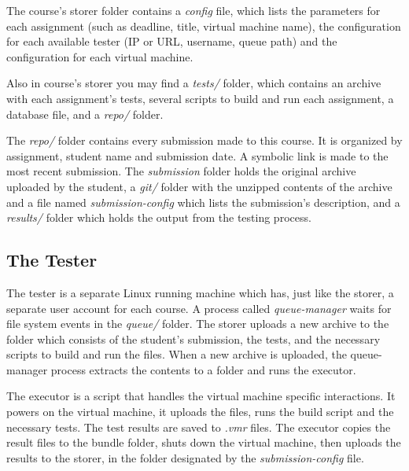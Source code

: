 The course's storer folder contains a {\it config} file, which lists the parameters
for each assignment (such as deadline, title, virtual machine name), the 
configuration for each available tester (IP or URL, username, queue path)
and the configuration for each virtual machine.

Also in course's storer you may find a \textit{tests/} folder, which contains an archive
with each assignment's tests, several scripts to build and run each assignment,
a database file, and a \textit{repo/} folder.

\begin{center}
\end{center}

The \textit{repo/} folder contains every submission made to this course. It is organized
by assignment, student name and submission date. A symbolic link is made to the 
most recent submission. The {\it submission} folder holds the original archive uploaded
by the student, a \textit{git/} folder with the unzipped contents of the archive and a 
file named \textit{submission-config} which lists the submission's description, and a
{\it results/} folder which holds the output from the testing process.

\subsection{The Tester}
\label{sub-sec:tester}

The tester is a separate Linux running machine which has, just like the storer,
a separate user account for each course. A process called \textit{queue-manager}
waits for file system events in the \textit{queue/} folder. The storer uploads a new
archive to the folder which consists of the student's submission, the tests, and
the necessary scripts to build and run the files. When a new archive is uploaded,
the queue-manager process extracts the contents to a folder and runs the executor.

\begin{center}
\end{center}

The executor is a script that handles the virtual machine specific interactions.
It powers on the virtual machine, it uploads the files, runs the build script and
 the necessary tests. The test results are saved to \textit{.vmr} files.
The executor copies the result files to the bundle folder, shuts down the
virtual machine, then uploads the results to the storer, in the folder designated
by the \textit{submission-config} file.


